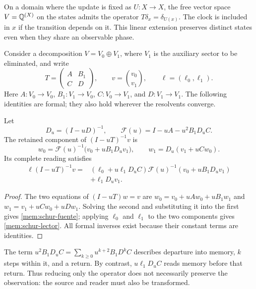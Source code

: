 On a domain where the update is fixed as \(U:X\to X\),
the free vector space \(V=\mathbb Q^{(X)}\) on the states admits the operator
\(T\delta_x=\delta_{U(x)}\). The clock is included in \(x\) if
the transition depends on it. This linear extension preserves distinct
states even when they share an observable phase.

Consider a decomposition \(V=V_0\oplus V_1\), where \(V_1\)
is the auxiliary sector to be eliminated, and write
\[
 T=\begin{pmatrix}A&B_1\\C&D\end{pmatrix},\qquad
 v=\binom{v_0}{v_1},\qquad \ell=(\ell_0,\ell_1).
\]
Here \(A:V_0\to V_0\), \(B_1:V_1\to V_0\),
\(C:V_0\to V_1\), and \(D:V_1\to V_1\).
The following identities are formal; they also hold wherever the
resolvents converge.

\begin{proposition}
\label{mem:prop-schur}
Let
\[
 D_u=(I-uD)^{-1},\qquad
 \mathscr F(u)=I-uA-u^2B_1D_uC.
\]
The retained component of \((I-uT)^{-1}v\) is
\begin{equation}
 w_0=\mathscr F(u)^{-1}\bigl(v_0+uB_1D_uv_1\bigr),
 \qquad w_1=D_u(v_1+uCw_0).
 \label{mem:schur-fuente}
\end{equation}
Its complete reading satisfies
\begin{equation}
 \begin{split}
 \ell(I-uT)^{-1}v
 ={}&(\ell_0+u\ell_1D_uC)
       \mathscr F(u)^{-1}(v_0+uB_1D_uv_1)\\
    &+\ell_1D_uv_1.
 \end{split}
 \label{mem:schur-lector}
\end{equation}
\end{proposition}
\begin{proof}
The two equations of \((I-uT)w=v\) are
\(w_0=v_0+uAw_0+uB_1w_1\) and
\(w_1=v_1+uCw_0+uDw_1\).
Solving the second and substituting it into the first gives
\eqref{mem:schur-fuente}; applying \(\ell_0\) and \(\ell_1\)
to the two components gives \eqref{mem:schur-lector}.
All formal inverses exist because their constant terms are identities.
\end{proof}

The term \(u^2B_1D_uC=\sum_{k\geq0}u^{k+2}B_1D^kC\)
describes departure into memory, \(k\) steps within it, and a return.
By contrast, \(u\ell_1D_uC\) reads memory before that return.
Thus reducing only the operator does not necessarily preserve the
observation: the source and reader must also be transformed.

